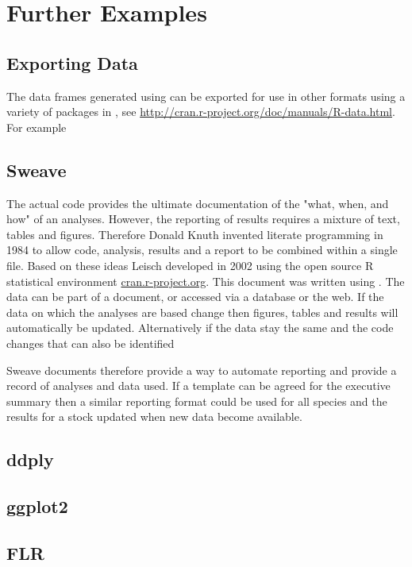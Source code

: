 
\section{Further Examples}

\subsection{Exporting Data}

The data frames generated using  can be exported for use in other formats using a variety of
packages in , see \url{http://cran.r-project.org/doc/manuals/R-data.html}. For example


\subsection{Sweave}

The actual code provides the ultimate documentation of the "what, when, and how" of an analyses. However, the reporting of results  requires
a mixture  of text, tables and figures. Therefore Donald Knuth invented literate programming in 1984 to allow code, analysis, results and a report 
to be combined within a single file.  Based on these ideas Leisch developed  in 2002 using the open source R statistical environment 
\url{cran.r-project.org}. This document was written using .  The data can be part of a  document, or accessed via a database
or the web. If the data on which the analyses 
are based change then figures, tables and results will automatically be updated. Alternatively if the data stay the same and the code changes
that can also be identified

Sweave documents therefore provide a way to  automate reporting 
and provide a record of analyses and data used. If a template can be agreed for the executive summary then a similar reporting format could be used 
for all species and the results for a stock updated when new data become available. 

\subsection{ddply}

\subsection{ggplot2}

\subsection{FLR}

